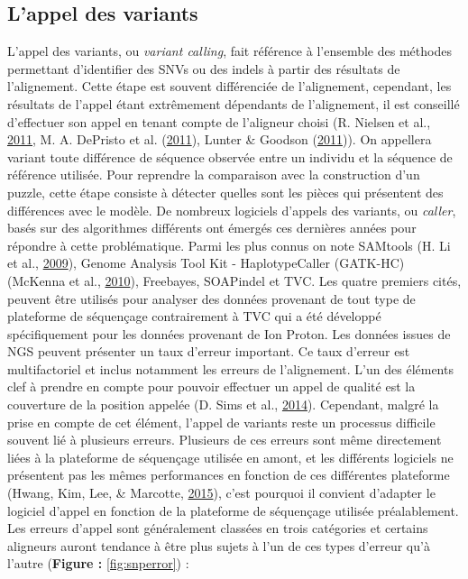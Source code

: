 \documentclass[12pt,twoside]{reedthesis}
\theoremstyle{definition}
\theoremstyle{definition}
\theoremstyle{remark}
\begin{document}
  \newpage
  
  \subsection{L'appel des variants}\label{varcall}
  
  L'appel des variants, ou \emph{variant calling}, fait référence à
  l'ensemble des méthodes permettant d'identifier des SNVs ou des indels à
  partir des résultats de l'alignement. Cette étape est souvent
  différenciée de l'alignement, cependant, les résultats de l'appel étant
  extrêmement dépendants de l'alignement, il est conseillé d'effectuer son
  appel en tenant compte de l'aligneur choisi (R. Nielsen et al.,
  \protect\hyperlink{ref-Nielsen2011}{2011}, M. A. DePristo et al.
  (\protect\hyperlink{ref-DePristo2011}{2011}), Lunter \& Goodson
  (\protect\hyperlink{ref-Lunter2011}{2011})). On appellera variant toute
  différence de séquence observée entre un individu et la séquence de
  référence utilisée. Pour reprendre la comparaison avec la construction
  d'un puzzle, cette étape consiste à détecter quelles sont les pièces qui
  présentent des différences avec le modèle. De nombreux logiciels
  d'appels des variants, ou \emph{caller}, basés sur des algorithmes
  différents ont émergés ces dernières années pour répondre à cette
  problématique. Parmi les plus connus on note SAMtools (H. Li et al.,
  \protect\hyperlink{ref-Li2009}{2009}), Genome Analysis Tool Kit -
  HaplotypeCaller (GATK-HC) (McKenna et al.,
  \protect\hyperlink{ref-McKenna2010}{2010}), Freebayes, SOAPindel et TVC.
  Les quatre premiers cités, peuvent être utilisés pour analyser des
  données provenant de tout type de plateforme de séquençage contrairement
  à TVC qui a été développé spécifiquement pour les données provenant de
  Ion Proton. Les données issues de NGS peuvent présenter un taux d'erreur
  important. Ce taux d'erreur est multifactoriel et inclus notamment les
  erreurs de l'alignement. L'un des éléments clef à prendre en compte pour
  pouvoir effectuer un appel de qualité est la couverture de la position
  appelée (D. Sims et al., \protect\hyperlink{ref-Sims2014}{2014}).
  Cependant, malgré la prise en compte de cet élément, l'appel de variants
  reste un processus difficile souvent lié à plusieurs erreurs. Plusieurs
  de ces erreurs sont même directement liées à la plateforme de séquençage
  utilisée en amont, et les différents logiciels ne présentent pas les
  mêmes performances en fonction de ces différentes plateforme (Hwang,
  Kim, Lee, \& Marcotte, \protect\hyperlink{ref-Hwang2015}{2015}), c'est
  pourquoi il convient d'adapter le logiciel d'appel en fonction de la
  plateforme de séquençage utilisée préalablement. Les erreurs d'appel
  sont généralement classées en trois catégories et certains aligneurs
  auront tendance à être plus sujets à l'un de ces types d'erreur qu'à
  l'autre (\textbf{Figure : }\ref{fig:snperror}) :
  
\end{document}
